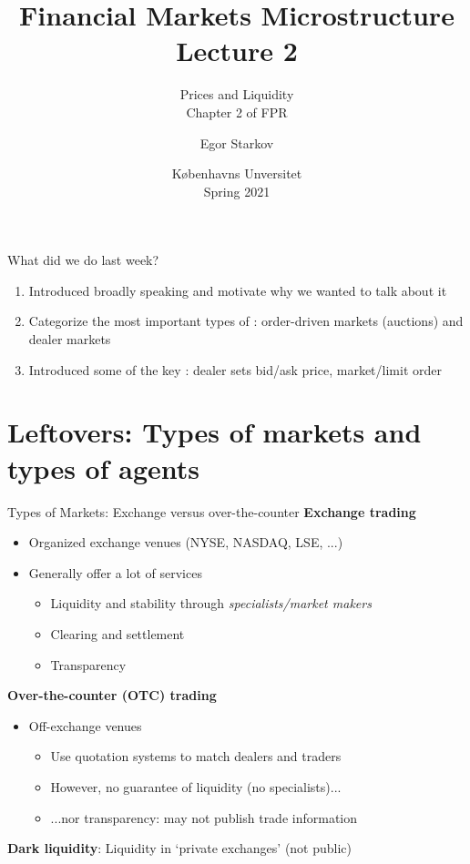 \documentclass[english,10pt
,aspectratio=169
]{beamer}
\title{Financial Markets Microstructure \\ Lecture 2}
\subtitle{Prices and Liquidity \\
Chapter 2 of FPR}
\author{Egor Starkov}
\date{K{\o}benhavns Unversitet \\
	Spring 2021}
\begin{document}
\frame[plain]{\titlepage}


\begin{frame}{What did we do last week?}
	\begin{enumerate}
		\item Introduced  broadly speaking and motivate why we wanted to talk about it
		\item Categorize the most important types of :  order-driven markets (auctions) and dealer markets
		\item Introduced some of the key : dealer sets bid/ask price, market/limit order
	\end{enumerate}
\end{frame}


\section{Leftovers: Types of markets and types of agents}

\begin{frame}{Types of Markets: Exchange versus over-the-counter}
	\textbf{Exchange trading}
	\begin{itemize}
		\item Organized exchange venues (NYSE, NASDAQ, LSE, ...)
		\item Generally offer a lot of services
		\begin{itemize}
			\item Liquidity and stability through \textit{specialists/market makers}
			\item Clearing and settlement
			\item Transparency
		\end{itemize}
	\end{itemize}
	\textbf{Over-the-counter (OTC) trading}
	\begin{itemize}
		\item Off-exchange venues
		\begin{itemize}
			\item Use quotation systems to match dealers and traders
			\item However, no guarantee of liquidity (no specialists)...
			\item ...nor transparency: may not publish trade information
		\end{itemize}
	\end{itemize}
	\textbf{Dark liquidity}: Liquidity in `private exchanges' (not public)
\end{frame}
\end{document}
